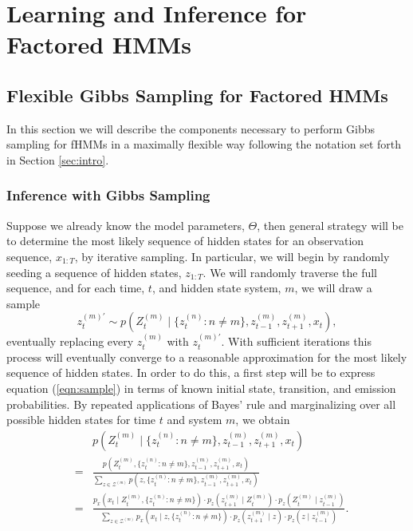 \documentclass{amsart}
\begin{document}
\section{Learning and Inference for Factored HMMs}

\subsection{Flexible Gibbs Sampling for Factored HMMs}

In this section we will describe the components necessary to perform Gibbs 
sampling for fHMMs in a maximally flexible way following the notation set forth 
in Section \ref{sec:intro}.  

\subsubsection{Inference with Gibbs Sampling}
Suppose we already know the model parameters, 
$\Theta$, then general strategy will be to determine the most 
likely sequence of hidden states for an observation sequence, $x_{1:T}$, by iterative 
sampling.  In particular, we will begin by randomly seeding a sequence of hidden 
states, $z_{1:T}$.  We will randomly traverse the full sequence, and for each time, 
$t$, and hidden state system, $m$, we will draw a sample  
\begin{equation}\label{eqn:sample}
{z_t^{(m)'}}\sim p(Z_t^{(m)}\mid \{z_t^{(n)}:n\neq m\},z_{t-1}^{(m)}, z_{t+1}^{(m)}, x_t),
\end{equation}
eventually replacing every $z_t^{(m)}$ with ${z_t^{(m)'}}$.  With sufficient 
iterations this process will eventually converge to a reasonable approximation 
for the most likely sequence of hidden states.  In order to do this, a first 
step will be to express equation (\ref{eqn:sample}) in terms of known 
initial state, transition, and emission probabilities.  By repeated applications of Bayes' rule and marginalizing over all possible hidden 
states for time $t$ and system $m$, we obtain 
\begin{eqnarray*}
&&p(Z_t^{(m)}\mid \{z_t^{(n)}:n\neq m\},z_{t-1}^{(m)}, z_{t+1}^{(m)}, x_t)\\
& = & \frac{
p(Z_t^{(m)},\{z_t^{(n)}:n\neq m\},z_{t-1}^{(m)}, z_{t+1}^{(m)}, x_t)
}{
\sum_{z\in \mathcal Z^{(m)}}p(z,\{z_t^{(n)}:n\neq m\},z_{t-1}^{(m)}, 
z_{t+1}^{(m)}, x_t)
}\\
& = & \frac{
p_x(x_t\mid Z_t^{(m)},\{z_t^{(n)}:n\neq m\})\cdot
p_z(z_{t+1}^{(m)}\mid Z_t^{(m)})\cdot
p_z(Z_t^{(m)}\mid z_{t-1}^{(m)})
}{
\sum_{z\in \mathcal Z^{(m)}}
p_x(x_t\mid z,\{z_t^{(n)}:n\neq m\})\cdot
p_z(z_{t+1}^{(m)}\mid z)\cdot
p_z(z\mid z_{t-1}^{(m)})
}.
\end{eqnarray*}
\end{document}
